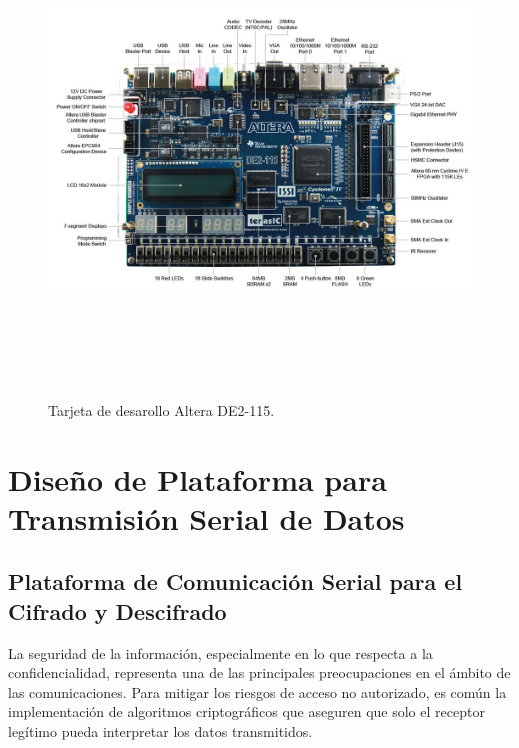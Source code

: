 \begin{figure}[h!] %
    \centering %
     \includegraphics[width=1\textwidth, height=13cm]{imagenes/img3} %
    \caption{Tarjeta de desarollo Altera DE2-115.}
    \label{fig:imagen3} %
\end{figure}



\chapter{Diseño de Plataforma para Transmisión Serial de Datos}

\section{Plataforma de Comunicación Serial para el Cifrado y Descifrado }
La seguridad de la información, especialmente en lo que respecta a la confidencialidad, representa una de las principales preocupaciones en el ámbito de las comunicaciones. Para mitigar los riesgos de acceso no autorizado, es común la implementación de algoritmos criptográficos que aseguren que solo el receptor legítimo pueda interpretar los datos transmitidos.

